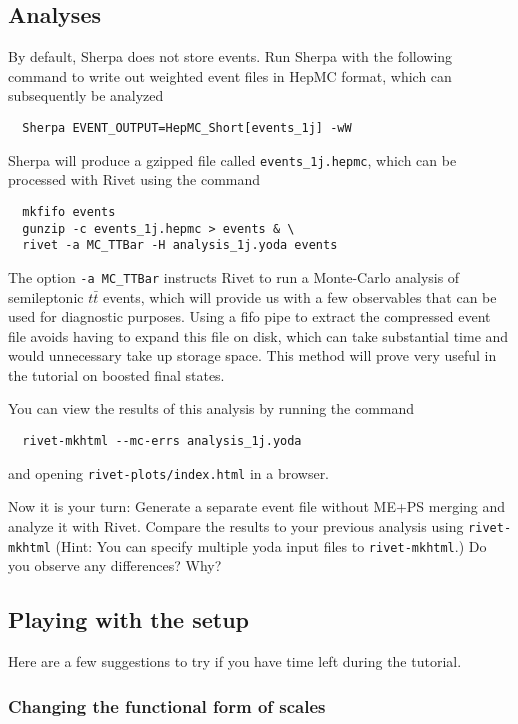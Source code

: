 \documentclass[10pt]{article}
\begin{document}
\subsection{Analyses}

By default, Sherpa does not store events. Run Sherpa with the following command 
to write out weighted event files in HepMC format, which can subsequently be analyzed
\begin{verbatim}
  Sherpa EVENT_OUTPUT=HepMC_Short[events_1j] -wW
\end{verbatim}
Sherpa will produce a gzipped file called {\tt events\_1j.hepmc}, 
which can be processed with Rivet using the command
\begin{verbatim}
  mkfifo events
  gunzip -c events_1j.hepmc > events & \
  rivet -a MC_TTBar -H analysis_1j.yoda events
\end{verbatim}
The option {\tt -a MC\_TTBar} instructs Rivet to run a Monte-Carlo analysis 
of semileptonic $t\bar{t}$ events, which will provide us with a few observables
that can be used for diagnostic purposes.
Using a fifo pipe to extract the compressed event file avoids having to expand
this file on disk, which can take substantial time and would unnecessary
take up storage space. This method will prove very useful in the tutorial
on boosted final states.


You can view the results of this analysis by running the command
\begin{verbatim}
  rivet-mkhtml --mc-errs analysis_1j.yoda
\end{verbatim}
and opening {\tt rivet-plots/index.html} in a browser.

Now it is your turn: Generate a separate event file without ME+PS merging 
and analyze it with Rivet. Compare the results to your previous analysis 
using {\tt rivet-mkhtml} (Hint: You can specify multiple yoda input files 
to {\tt rivet-mkhtml}.) Do you observe any differences? Why?

\subsection{Playing with the setup}

Here are a few suggestions to try if you have time left during the tutorial.

\subsubsection{Changing the functional form of scales}
\end{document}
